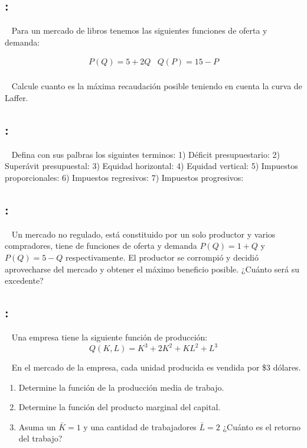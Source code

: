 \documentclass[
  letterpaper,
  DIV=11,
  numbers=noendperiod]{scrreport}
\begin{document}
\hypertarget{section-13}{%
\subsection{:}\label{section-13}}

~ Para un mercado de libros tenemos las siguientes funciones de oferta y
demanda:

\[
\begin{array}{cc} P(Q)=5+2Q & Q(P)=15-P\\\end{array}
\]

~ Calcule cuanto es la máxima recaudación posible teniendo en cuenta la
curva de Laffer.

\hypertarget{section-14}{%
\subsection{:}\label{section-14}}

~ Defina con sus palbras los siguintes terminos: 1) Déficit
presupuestario: 2) Superávit presupuestal: 3) Equidad horizontal: 4)
Equidad vertical: 5) Impuestos proporcionales: 6) Impuestos regresivos:
7) Impuestos progresivos:

\hypertarget{section-15}{%
\subsection{:}\label{section-15}}

~ Un mercado no regulado, está constituido por un solo productor y
varios compradores, tiene de funciones de oferta y demanda \(P(Q)=1+Q\)
y \(P(Q)=5-Q\) respectivamente. El productor se corrompió y decidió
aprovecharse del mercado y obtener el máximo beneficio posible. ¿Cuánto
será su excedente?

\hypertarget{section-16}{%
\subsection{:}\label{section-16}}

~ Una empresa tiene la siguiente función de producción: \[
Q(K,L)=K^3+2K^2+KL^2+L^3
\]

~ En el mercado de la empresa, cada unidad producida es vendida por \$3
dólares.

\begin{enumerate}
\def\labelenumi{\arabic{enumi})}
\item
  Determine la función de la producción media de trabajo.
\item
  Determine la función del producto marginal del capital.
\item
  Asuma un \(\bar{K}=1\) y una cantidad de trabajadores \(\bar{L}=2\)
  ¿Cuánto es el retorno del trabajo?
\end{enumerate}
\end{document}
